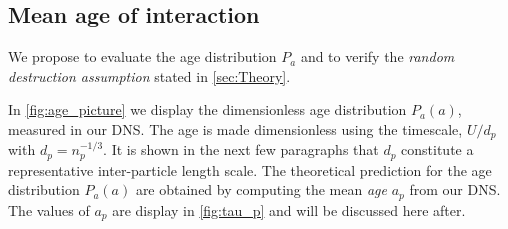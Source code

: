 
\subsection{Mean age of interaction}

We propose to evaluate the age distribution $P_a$ and to verify the \textit{random destruction assumption} stated in \ref{sec:Theory}. 

In \ref{fig:age_picture} we display the dimensionless age distribution $P_a(a)$, measured in our DNS. 
The age is made dimensionless using the timescale, $U/d_p$ with $d_p = n_p^{-1/3}$.
It is shown in the next few paragraphs that $d_p$ constitute a representative inter-particle length scale. 
The theoretical prediction for the age distribution $P_a(a)$ are obtained by computing the mean \textit{age} $a_p$ from our DNS. 
The values of $a_p$ are display in \ref{fig:tau_p} and will be discussed here after. 

